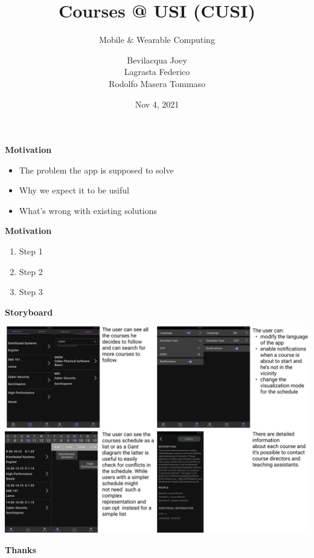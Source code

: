 \documentclass[t,aspectratio=1610]{beamer}
\title{Courses @ USI (CUSI)}
\subtitle{Mobile \& Wearable Computing}
\author{Bevilacqua Joey \\ Lagrasta Federico \\ Rodolfo Masera Tommaso}
\institute{Universit\`a della Svizzera Italiana\\ Faculty of Informatics\\ \href{http://www.unisi.ch}{www.unisi.ch}}
\date{Nov 4, 2021}
\begin{document}
{

\begin{frame}
\maketitle
\end{frame}
}

{

\begin{frame}
\textbf{Motivation} \\

\begin{itemize}
\item The problem the app is supposed to solve
\item Why we expect it to be usiful
\item What's wrong with existing solutions
\end{itemize}
\end{frame}
}

{
\begin{frame}
\textbf{Motivation} \\

\begin{enumerate}
\item Step 1
\item Step 2
\item Step 3
\end{enumerate}
\end{frame}
}

{
\begin{frame}
\textbf{Storyboard} \\

\centerline{\includegraphics[scale=0.13]{storyboard.jpg}}
\end{frame}
}

{

\begin{frame}
\textbf{Thanks} \\

\end{frame}
}
\end{document}
